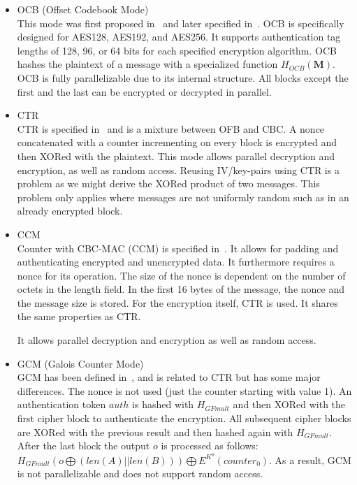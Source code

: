\begin{itemize}
	\item OCB (Offset Codebook Mode)\\
	This mode was first proposed in~\cite{rogaway2003ocb} and later specified in~\cite{krovetz-ocb-04}. OCB is specifically designed for AES128, AES192, and AES256. It supports authentication tag lengths of 128, 96, or 64 bits for each specified encryption algorithm. OCB hashes the plaintext of a message with a specialized function $H_{OCB}(\mathbf{M})$. OCB is fully parallelizable due to its internal structure. All blocks except the first and the last can be encrypted or decrypted in parallel.
	\item CTR\\
	CTR is specified in~\cite{lipmaa2000ctr} and is a mixture between OFB and CBC. A nonce concatenated with a counter incrementing on every block is encrypted and then XORed with the plaintext. This mode allows parallel decryption and encryption, as well as random access. Reusing IV/key-pairs using CTR is a problem as we might derive the XORed product of two messages. This problem only applies where messages are not uniformly random such as in an already encrypted block.
	\item CCM\\
	Counter with CBC-MAC (CCM) is specified in~\cite{rfc3610}. It allows for padding and authenticating encrypted and unencrypted data. It furthermore requires a nonce for its operation. The size of the nonce is dependent on the number of octets in the length field. In the first 16 bytes of the message, the nonce and the message size is stored. For the encryption itself, CTR is used. It shares the same properties as CTR. 
	
	It allows parallel decryption and encryption as well as random access.
	\item GCM (Galois Counter Mode)\\
	GCM has been defined in~\cite{mcgrew2004galois}, and is related to CTR but has some major differences. The nonce is not used (just the counter starting with value 1). An authentication token $auth$ is hashed with $H_{GFmult}$ and then XORed with the first cipher block to authenticate the encryption. All subsequent cipher blocks are XORed with the previous result and then hashed again with $H_{GFmult}$. After the last block the output $o$ is processed  as follows: $H_{GFmult}(o\bigoplus (len(A)||len(B))) \bigoplus E^{K^0}(counter_0)$. As a result, GCM is not parallelizable and does not support random access.
	

\end{itemize}

